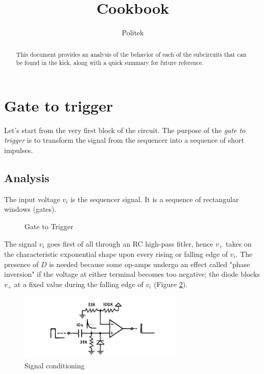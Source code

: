 \documentclass{article}
\title{Cookbook}
\author{Politek}
\theoremstyle{definition}
\begin{document}
\maketitle


\begin{abstract}
    This document provides an analysis of the behavior of each of the subcircuits that can be found in the kick, along with a quick summary for future reference.
\end{abstract}

\tableofcontents

\section{Gate to trigger}
Let's start from the very first block of the circuit.
The purpose of the \textit{gate to trigger} is to transform the signal from the sequencer into a sequence of short impulses.

\subsection{Analysis}
The input voltage \(v_i\) is the sequencer signal. It is a sequence of rectangular windows (gates).

\begin{figure}[ht]
    \centering
    
    \label{fig:gate-to-trigger}
    \caption{Gate to Trigger}
\end{figure}

The signal \(v_i\) goes first of all through an RC high-pass fitler, hence \(v_+\) takes on the characteristic exponential shape upon every rising or falling edge of \(v_i\).
The presence of \(D\) is needed because some op-amps undergo an effect called "phase inversion" if the voltage at either terminal becomes too negative; the diode blocks \(v_+\) at a fixed value during the falling edge of \(v_i\) (Figure \ref{fig:gate-to-trigger-conditioning}).

\begin{figure}[htp]
    \centering
    \includegraphics[width=0.7\textwidth]{../images/gatebase.png} 
    \caption{Signal conditioning}
    \label{fig:gate-to-trigger-conditioning}
\end{figure}
\end{document}
